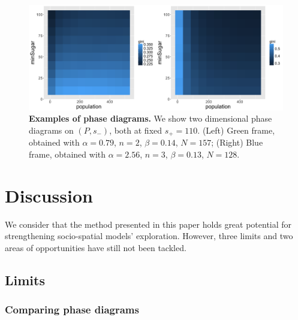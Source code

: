 \documentclass{JASSS}
\begin{document}
\begin{figure}[!t]
\centering
	\includegraphics[width=\textwidth]{figures/Fig6.png}
\caption{\textbf{Examples of phase diagrams.} We show two dimensional phase diagrams on $(P,s_-)$, both at fixed $s_+ = 110$. (Left) Green frame, obtained with $\alpha = 0.79$, $n=2$, $\beta = 0.14$, $N=157$; (Right) Blue frame, obtained with $\alpha = 2.56$, $n=3$, $\beta = 0.13$, $N=128$.}
\label{fig:sugarscape-phasediagrams}
\end{figure}


\section{Discussion}

We consider that the method presented in this paper holds great potential for strengthening socio-spatial models' exploration. However, three limits and two areas of opportunities have still not been tackled. 

\subsection{Limits}

\subsubsection{Comparing phase diagrams}
\end{document}
